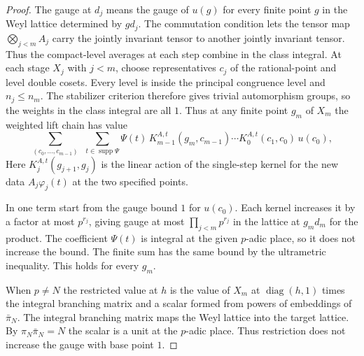 \begin{proof}
The gauge at $d_j$ means the gauge of $u(g)$ for every finite point $g$ in the Weyl lattice determined by $gd_j$. The commutation condition lets the tensor map $\bigotimes_{j<m}A_j$ carry the jointly invariant tensor to another jointly invariant tensor. Thus the compact-level averages at each step combine in the class integral. At each stage $X_j$ with $j<m$, choose representatives $c_j$ of the rational-point and level double cosets. Every level is inside the principal congruence level and $n_j\le n_m$. The stabilizer criterion therefore gives trivial automorphism groups, so the weights in the class integral are all $1$. Thus at any finite point $g_m$ of $X_m$ the weighted lift chain has value
\[
 \sum_{(c_0,\ldots,c_{m-1})}\ \
 \sum_{t\in\operatorname{supp}\Psi}
 \Psi(t)\,K^{A,t}_{m-1}(g_m,c_{m-1})\cdots
 K^{A,t}_0(c_1,c_0)\,u(c_0),
\]
Here $K^{A,t}_j(g_{j+1},g_j)$ is the linear action of the single-step kernel for the new data $A_j\varphi_j(t)$ at the two specified points.

In one term start from the gauge bound $1$ for $u(c_0)$. Each kernel increases it by a factor at most $p^{r_j}$, giving gauge at most $\prod_{j<m}p^{r_j}$ in the lattice at $g_md_m$ for the product. The coefficient $\Psi(t)$ is integral at the given $p$-adic place, so it does not increase the bound. The finite sum has the same bound by the ultrametric inequality. This holds for every $g_m$.

When $p\ne N$ the restricted value at $h$ is the value of $X_m$ at $\operatorname{diag}(h,1)$ times the integral branching matrix and a scalar formed from powers of embeddings of $\bar\pi_N$. The integral branching matrix maps the Weyl lattice into the target lattice. By $\pi_N\bar\pi_N=N$ the scalar is a unit at the $p$-adic place. Thus restriction does not increase the gauge with base point $1$.
\end{proof}

